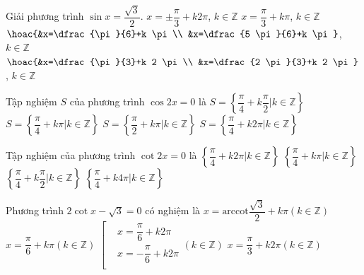 \begin{ex}%
	Giải phương  trình $\sin x=\dfrac{\sqrt{3}}{2}$.
	 \choice
		{$x= \pm \dfrac{\pi}{3}+k 2  \pi$, $k\in\mathbb{Z}$}
		{$x=\dfrac{\pi}{3}+k \pi$,  $k\in\mathbb{Z}$}
		{$\hoac{&x=\dfrac{\pi}{6}+k  \pi \\ &x=\dfrac{5 \pi}{6}+k \pi}$, $k\in\mathbb{Z}$}
		{\True $\hoac{&x=\dfrac{\pi}{3}+k 2 \pi \\ &x=\dfrac{2  \pi}{3}+k 2 \pi}$, $k\in\mathbb{Z}$}
\end{ex}

\begin{ex}%
	Tập nghiệm  $S$ của phương trình $\cos 2x=0$ là
	\choice 
		{\True $S=\left\{\dfrac{\pi }{4}+k\dfrac{\pi  }{2}\big|k\in \mathbb{Z}\right\}$}
		{$S=\left\{\dfrac{\pi  }{4}+k\pi \big|k\in \mathbb{Z}\right\}$}
		{$S=\left\{\dfrac{\pi }{2}+k\pi  \big|k\in \mathbb{Z}\right\}$}
		 {$S=\left\{\dfrac{\pi }{4}+k2\pi \big|k\in \mathbb{Z}\right\}$}
\end{ex}

\begin{ex}%
	Tập nghiệm của phương trình  $\cot 2x=0$ là
	\choice 
		{$\left\{ \dfrac{\pi }{4}+k2\pi  |k\in \mathbb{Z} \right\}$}
		{$\left\{ \dfrac{\pi }{4}+k\pi |k\in \mathbb{Z} \right\}$} 
		{\True $\left\{  \dfrac{\pi }{4}+k\dfrac{\pi }{2}|k\in \mathbb{Z} \right\}$}
		{$\left\{ \dfrac{\pi }{4}+k4\pi |k\in \mathbb{Z}  \right\}$}
\end{ex}

\begin{ex}%
	Phương trình $2\cot x-\sqrt{3}=0$ có nghiệm là 
	\choice 
		{\True  $x=\text{arccot}\dfrac{\sqrt{3}}{2}+k\pi \left( k\in \mathbb{Z} \right)$}
		{$x=\dfrac{\pi  }{6}+k\pi \left( k\in \mathbb{Z} \right)$}
		{$\left[\begin{aligned}
		& x=\dfrac{\pi  }{6}+k2\pi \\
		 & x=-\dfrac{\pi }{6}+k2\pi \\
\end{aligned} \right.\left( k\in \mathbb{Z} \right)$}
{$x=\dfrac{\pi }{3}+k2\pi \left(  k\in \mathbb{Z} \right)$}
\end{ex}

